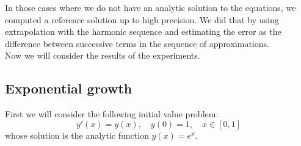 In those cases where we do not have an analytic solution to the equations, we computed a reference solution up to high precision. We did that by using extrapolation with the harmonic sequence and estimating the error as the difference between successive terms in the sequence of approximations.\\

Now we will consider the results of the experiments.

\subsection{Exponential growth}
First we will consider the following initial value problem:
\begin{equation}\label{42}
y'(x) = y(x),\quad y(0) = 1, \quad x\in [0,1]
\end{equation}
whose solution is the analytic function \(y(x) = e^x\).

